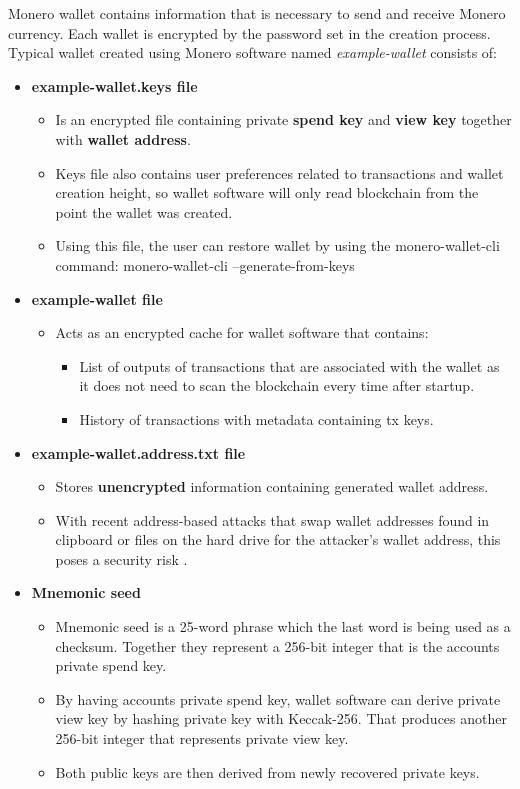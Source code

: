 \documentclass[
  printed, %
  table,   %
  nolof,     %
  nolot,     %
           oneside, color
]{fithesis3}
\begin{document}
Monero wallet contains information that is necessary to send and receive Monero currency. Each wallet is encrypted by the password set in the creation process. Typical wallet created using Monero software named \textit{example-wallet} consists of:
\begin{itemize}\itemsep0em
\item \textbf{example-wallet.keys file}
\begin{itemize}\itemsep0em
\item Is an encrypted file containing private \textbf{spend key} and \textbf{view key} together with \textbf{wallet address}.
\item Keys file also contains user preferences related to transactions and wallet creation height, so wallet software will only read blockchain from the point the wallet was created.
\item Using this file, the user can restore wallet by using the monero-wallet-cli command: monero-wallet-cli --generate-from-keys
\end{itemize}
\item \textbf{example-wallet file}
\begin{itemize}\itemsep0em
\item Acts as an encrypted cache for wallet software that contains:
\begin{itemize}\itemsep0em
\item List of outputs of transactions that are associated with the wallet as it does not need to scan the blockchain every time after startup.
\item History of transactions with metadata containing tx keys.
\end{itemize}
\end{itemize}
\item \textbf{example-wallet.address.txt file}
\begin{itemize}\itemsep0em
\item Stores \textbf{unencrypted} information containing generated wallet address.
\item With recent address-based attacks that swap wallet addresses found in clipboard or files on the hard drive for the attacker's wallet address, this poses a security risk \cite{cryptoshuffler}.
\end{itemize}
\item \textbf{Mnemonic seed}
\begin{itemize}\itemsep0em
\item Mnemonic seed is a 25-word phrase which the last word is being used as a checksum. Together they represent a 256-bit integer that is the accounts private spend key.
\item By having accounts private spend key, wallet software can derive private view key by hashing private key with Keccak-256. That produces another 256-bit integer that represents private view key.
\item Both public keys are then derived from newly recovered private keys.
\end{itemize}
\end{itemize}
\end{document}
